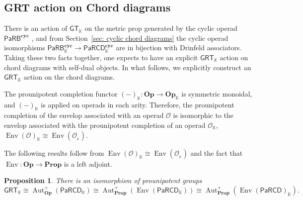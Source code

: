 \documentclass{amsart}
\newcommand{\bC}{\mathbf{C}}
\newcommand{\bA}{\mathbf{A}}
\newcommand{\calO}{\mathcal{O}}
\newcommand{\kk}{\mathbb{K}}    %
\newcommand{\PaRB}{\mathsf{PaRB}}
\newcommand{\PaRCD}{\mathsf{PaRCD}}
\newcommand{\hPaRB}{{\PaRB}_{\kk}}
\newcommand{\hPaRCD}{{\PaRCD}_{\kk}}
\newcommand{\cyc}{\mathbf{cyc}}
\newcommand{\Op}{\mathbf{Op}}
\newcommand{\Prop}{\mathbf{Prop}}
\newcommand{\End}{\operatorname{End}}
\newcommand{\Aut}{\operatorname{Aut}}
\newcommand{\Env}{\operatorname{Env}}
\newcommand{\lrar}{\ensuremath{\longrightarrow}}
\newcommand{\GT}{{\mathsf{GT}}}
\newcommand{\GRT}{{\mathsf{GRT}}}
\newtheorem{prop}[theorem]{Proposition}%
\newtheorem{cor}[theorem]{Corollary}%
\theoremstyle{definition}
\numberwithin{equation}{section}
\begin{document}


\subsection{GRT action on Chord diagrams}\label{subsec: GRT action on the category A(K)}

There is an action of $\GT_{\kk}$ on the metric prop generated by the cyclic operad $\PaRB^{\cyc}$ \cite{RS2025cyclicgt}, and from Section~\ref{sec: cyclic chord diagrams} the cyclic operad isomorphisms $\hPaRB^{\cyc} \lrar \hPaRCD^{\cyc}$ are in bijection with Drinfeld associators. Taking these two facts together, one expects to have an explicit $\GRT_{\kk}$ action on chord diagrams with self-dual objects. In what follows, we explicitly construct an $\GRT_{\kk}$ action on the chord diagrams.

The prounipotent completion functor $(-)_{\kk}:\Op\rightarrow \Op_{\kk}$ is symmetric monoidal, and $(-)_{\kk}$ is applied on operads in each arity. Therefore, the prounipotent completion of the envelop associated with an operad $\calO$ is isomorphic to the envelop associated with the prounipotent completion of an operad $\calO_{\kk}$,
$\operatorname{Env}(\calO)_{\kk}\cong \operatorname{Env}(\calO_{_{\kk}})$.

The following results follow from $\operatorname{Env}(\calO)_{\kk}\cong \operatorname{Env}(\calO_{_{\kk}})$ and the fact that $\Env: \Op \lrar \Prop$ is a left adjoint.

\begin{prop}\label{cor: GRT action on Envelop}
There is an isomorphism of prounipotent groups \[\GRT_{\kk}\cong \Aut^{+}_{\Op}(\hPaRCD) \cong \Aut^{+}_{\Prop}(\operatorname{Env}(\hPaRCD)) \cong \Aut^{+}_{\Prop}({\operatorname{Env}(\PaRCD)_{\kk}}).\]
\end{prop}
\end{document}
